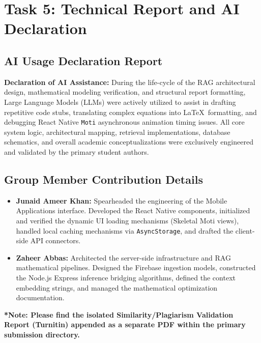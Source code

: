 \documentclass[12pt, a4paper]{report}
\begin{document}
\chapter{Task 5: Technical Report and AI Declaration}

\section{AI Usage Declaration Report}
\textbf{Declaration of AI Assistance:} 
During the life-cycle of the RAG architectural design, mathematical modeling verification, and structural report formatting, Large Language Models (LLMs) were actively utilized to assist in drafting repetitive code stubs, translating complex equations into \LaTeX\ formatting, and debugging React Native \texttt{Moti} asynchronous animation timing issues. 
All core system logic, architectural mapping, retrieval implementations, database schematics, and overall academic conceptualizations were exclusively engineered and validated by the primary student authors.

\section{Group Member Contribution Details}
\begin{itemize}
    \item \textbf{Junaid Ameer Khan:} Spearheaded the engineering of the Mobile Applications interface. Developed the React Native components, initialized and verified the dynamic UI loading mechanisms (Skeletal Moti views), handled local caching mechanisms via \texttt{AsyncStorage}, and drafted the client-side API connectors.
    
    \item \textbf{Zaheer Abbas:} Architected the server-side infrastructure and RAG mathematical pipelines. Designed the Firebase ingestion models, constructed the Node.js Express inference bridging algorithms, defined the context embedding strings, and managed the mathematical optimization documentation.
\end{itemize}

\textbf{*Note: Please find the isolated Similarity/Plagiarism Validation Report (Turnitin) appended as a separate PDF within the primary submission directory.}
\end{document}
